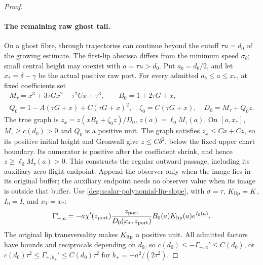 \begin{proof}
\paragraph{The remaining raw ghost tail.}
On a ghost fibre, through trajectories can continue beyond the cutoff
\(\tau u=d_0\) of the growing estimate. The first-lip abscissa differs from the minimum
speed \(\sigma_\theta\); small central height may coexist with
\(a=\tau u>d_0\). Put \(a_b=d_0/2\), and let
\(x_*=\delta-\gamma\) be the actual positive raw port. For every
admitted \(a_b\le a\le x_*\), at fixed coefficients set
\[
 \begin{gathered}
 M_\tau=x^3+3\tau Gx^2-\tau^2Ux+\tau^3,\qquad B_0=1+2\tau G+x,\\
 Q_0=1-A(\tau G+x)+C(\tau G+x)^2,\quad
 \zeta_0=C(\tau G+x),\quad D_0=M_\tau+Q_0z.
 \end{gathered}
\]
The true graph is \(z_x=z(xB_0+\zeta_0z)/D_0\),
\(z(a)=\ell_0M_\tau(a)\). On \([a,x_*]\), \(M_\tau\ge c(d_0)>0\)
and \(Q_0\) is a positive unit. The graph satisfies
\(z_x\le Cx+Cz\), so its positive initial height and Gronwall
give \(z\le C\delta^2\), below the fixed upper chart boundary.
Its numerator is positive after the coefficient shrink, and hence
\(z\ge\ell_0M_\tau(a)>0\). This constructs the regular outward
passage, including its auxiliary zero-flight endpoint. Append the
observer only when the image lies in its original buffer; the auxiliary
endpoint needs no observer value when its image is outside that buffer.
Use \eqref{deg:scalar-polynomial-lip-slope}, with \(\sigma=\tau\),
\(K_{\rm lip}=K\), \(I_0=I\), and \(x_T=x_*\):
\begin{equation}\label{deg:compact-raw-tail-input}
 \Gamma_{+,a}'=-a\chi'(z_{\rm port})\frac{z_{\rm port}}{D_0(x_*,z_{\rm port})}
                   B_0(a)K_{\rm lip}(a)e^{I_0(a)}.
\end{equation}
The original lip transversality makes \(K_{\rm lip}\) a positive
unit. All admitted factors have bounds and reciprocals depending on
\(d_0\), so \(c(d_0)\le-\Gamma_{+,a}'\le C(d_0)\), or
\(c(d_0)\tau^2\le\Gamma_{+,b_+}'\le C(d_0)\tau^2\)
for \(b_+=-a^2/(2\tau^2)\).


\end{proof}
